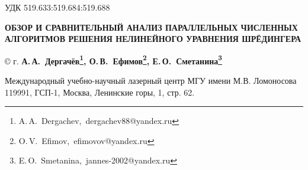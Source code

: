 \documentclass[12pt,a4paper,twoside]{article}
\makeatletter
\def\footnoteDergachev{A.\,A.~Dergachev,~dergachev88@yandex.ru}
\def\footnoteEfimov{O.\,V.~Efimov,~efimovov@yandex.ru}
\def\footnoteSmetanina{E.\,O.~Smetanina,~jannes-2002@yandex.ru}
\makeatother
\begin{document}
	\thispagestyle{empty}

    \noindent УДК 519.633:519.684:519.688

    \noindent \textbf{ОБЗОР И СРАВНИТЕЛЬНЫЙ АНАЛИЗ ПАРАЛЛЕЛЬНЫХ ЧИСЛЕННЫХ АЛГОРИТМОВ РЕШЕНИЯ НЕЛИНЕЙНОГО УРАВНЕНИЯ ШРЁДИНГЕРА}

	\vspace{1em}

    \noindent \copyright {} г. \quad \textbf{
    	А.\,А.~Дергачёв\footnote[1]{\footnoteDergachev},
    	О.\,В.~Ефимов\footnote[2]{\footnoteEfimov},
    	Е.\,О.~Сметанина\footnote[3]{\footnoteSmetanina}
   }

	\vspace{0.5em}

    \noindent Международный учебно-научный лазерный центр МГУ имени М.В. Ломоносова \\
    119991, ГСП-1, Москва, Ленинские горы, 1, стр. 62.

	\vspace{-3em}
\end{document}
